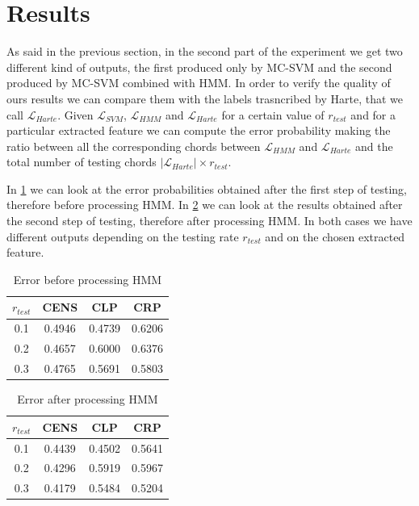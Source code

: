 \section{Results}
\label{sec:results}


As said in the previous section, in the second part of the experiment we get two different kind of outputs, the first produced only by MC-SVM and the second produced by MC-SVM combined with HMM. In order to verify the quality of ours results we can compare them with the labels trasncribed by Harte, that we call $\mathcal{L}_{Harte}$. Given $\mathcal{L}_{SVM}$, $\mathcal{L}_{HMM}$ and $\mathcal{L}_{Harte}$ for a certain value of $r_{test}$ and for a particular extracted feature we can compute the error probability making the ratio between all the corresponding chords between $\mathcal{L}_{HMM}$ and $\mathcal{L}_{Harte}$ and the total number of testing chords $|\mathcal{L}_{Harte}| \times r_{test}$. 


 In \ref{tab:resultbeforeHMM} we can look at the error probabilities obtained after the first step of testing, therefore before processing HMM. In \ref{tab:resultafterHMM} we can look at the results obtained after the second step of testing, therefore after processing HMM. In both cases we have different outputs depending on the testing rate $r_{test}$ and on the chosen extracted feature.

\begin{table}[h!]
	\caption{Error before processing HMM}
	\centering
	\begin{tabular}{|c |c c c|}
	\hline
	$r_{test}$ & CENS & CLP & CRP\\ \hline
	0.1 & 0.4946 & 0.4739 & 0.6206\\
	0.2 & 0.4657 & 0.6000 & 0.6376\\
	0.3 & 0.4765 & 0.5691 & 0.5803\\
	\hline
	\end{tabular}
	\label{tab:resultbeforeHMM}
\end{table}

\begin{table}[h!]
	\caption{Error after processing HMM}
	\centering
	\begin{tabular}{|c |c c c|}
	\hline
	$r_{test}$ & CENS & CLP & CRP\\ \hline
	0.1 & 0.4439 & 0.4502 & 0.5641\\
	0.2 & 0.4296 & 0.5919 & 0.5967\\
	0.3 & 0.4179 & 0.5484 & 0.5204\\
	\hline
	\end{tabular}
	\label{tab:resultafterHMM}
\end{table}

